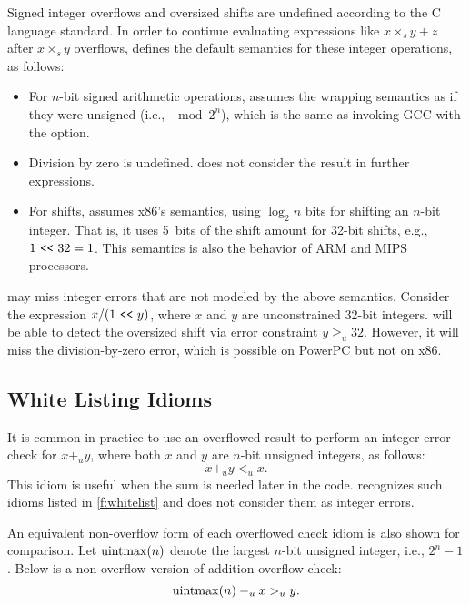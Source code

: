 Signed integer overflows and oversized shifts are undefined according
to the C language standard.  In order to continue evaluating
expressions like $x \times_s y + z$ after $x \times_s y$ overflows,
\sys defines the default semantics for these integer operations, as
follows:
\begin{itemize}
\item
For $n$-bit signed arithmetic operations, \sys assumes the wrapping
semantics as if they were unsigned (i.e., $\mod{2^n}$), which is
the same as invoking GCC with the  option.
\item
Division by zero is undefined.  \sys does not consider the result
in further expressions.
\item
For shifts, \sys assumes x86's semantics, using $\log_2 n$ bits for
shifting an $n$-bit integer.  That is, it uses 5~bits of the shift
amount for 32-bit shifts, e.g., $1 \ \texttt{<}\texttt{<}\  32 = 1$.  This semantics
is also the behavior of ARM and MIPS processors.
\end{itemize}
\sys may miss integer errors that are not modeled by the above
semantics.  Consider the expression $x / (1 \ \texttt{<}\texttt{<}\  y)$, where $x$ and
$y$ are unconstrained 32-bit integers.  \sys will be able to detect
the oversized shift via error constraint $y \geq_u 32$.  However,
it will miss the division-by-zero error, which is possible on PowerPC
but not on x86.

\subsection{White Listing Idioms}
\label{s:sema:whitelist}

It is common in practice to use an overflowed result to perform
an integer error check for $x +_u y$, where both $x$ and $y$ are
$n$-bit unsigned integers, as follows:
\begin{equation*}
x +_u y <_u x.
\end{equation*}
This idiom is useful when the sum is needed later in the code.
\sys recognizes such idioms listed in \autoref{f:whitelist} and
does not consider them as integer errors.

An equivalent non-overflow form of each overflowed check idiom is
also shown for comparison.  Let $\operatorname{uintmax}(n)$ denote the largest
$n$-bit unsigned integer, i.e., $2^n - 1$.  Below is a non-overflow
version of addition overflow check:
\begin{equation*}
\operatorname{uintmax}(n) -_u x >_u y.
\end{equation*}

